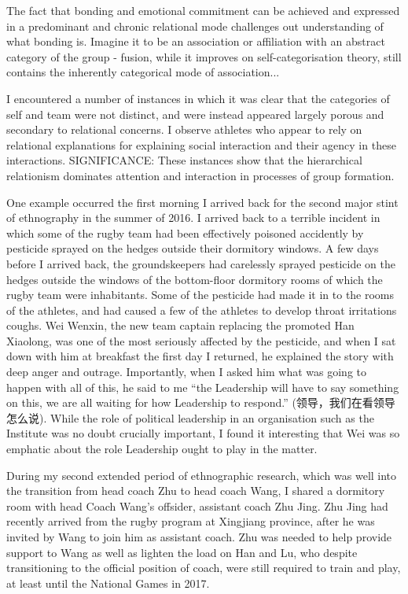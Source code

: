   The fact that bonding and emotional commitment can be achieved and expressed in a predominant and chronic relational mode challenges out understanding of what bonding is.  Imagine it to be an association or affiliation with an abstract category of the group - fusion, while it improves on self-categorisation theory, still contains the inherently categorical mode of association...



  I encountered a number of instances in which it was clear that the categories of self and team were not distinct, and were instead appeared largely porous and secondary to relational concerns. I observe athletes who appear to rely on relational explanations for explaining social interaction and their agency in these interactions.
  SIGNIFICANCE:  These instances show that the hierarchical relationism dominates attention and interaction in processes of group formation.

  One example occurred the first morning I arrived back for the second major stint of ethnography in the summer of 2016. I arrived back to a terrible incident in which some of the rugby team had been effectively poisoned accidently by pesticide sprayed on the hedges outside their dormitory windows.  A few days before I arrived back, the groundskeepers had carelessly sprayed pesticide on the hedges outside the windows of the bottom-floor dormitory rooms of which the rugby team were inhabitants.  Some of the pesticide had made it in to the rooms of the athletes, and had caused a few of the athletes to develop throat irritations coughs.  Wei Wenxin, the new team captain replacing the promoted Han Xiaolong, was one of the most seriously affected by the pesticide, and when I sat down with him at breakfast the first day I returned, he explained the story with deep anger and outrage.  Importantly, when I asked him what was going to happen with all of this, he said to me ``the Leadership will have to say something on this, we are all waiting for how Leadership to respond.'' (领导，我们在看领导怎么说). While the role of political leadership in an organisation such as the Institute was no doubt crucially important, I found it interesting that Wei was so emphatic about the role Leadership ought to play in the matter.

  During my second extended period of ethnographic research, which was well into the transition from head coach Zhu to head coach Wang, I shared a dormitory room with head Coach Wang's offsider, assistant coach Zhu Jing.  Zhu Jing had recently arrived from the rugby program at Xingjiang province, after he was invited by Wang to join him as assistant coach.  Zhu was needed to help provide support to Wang as well as lighten the load on Han and Lu, who despite transitioning to the official position of coach, were still required to train and play, at least until the National Games in 2017.

